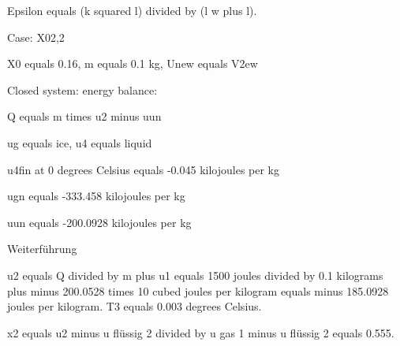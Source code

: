 Epsilon equals (k squared l) divided by (l w plus l).

Case: X02,2

X0 equals 0.16, m equals 0.1 kg, Unew equals V2ew

Closed system: energy balance:

Q equals m times u2 minus uun

ug equals ice, u4 equals liquid

u4fin at 0 degrees Celsius equals -0.045 kilojoules per kg

ugn equals -333.458 kilojoules per kg

uun equals -200.0928 kilojoules per kg

Weiterführung

u2 equals Q divided by m plus u1 equals 1500 joules divided by 0.1 kilograms plus minus 200.0528 times 10 cubed joules per kilogram equals minus 185.0928 joules per kilogram. T3 equals 0.003 degrees Celsius.

x2 equals u2 minus u flüssig 2 divided by u gas 1 minus u flüssig 2 equals 0.555.